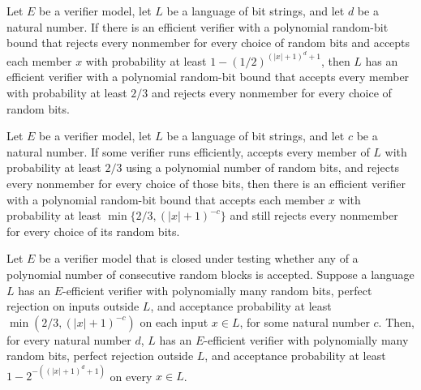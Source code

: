 \begin{theorem}
\label{Randomized.InRPStrong.toInRP}
\leanok
{}
Let $E$ be a verifier model, let $L$ be a language of bit strings, and let $d$ be a
natural number. If there is an efficient verifier with a polynomial random-bit bound
that rejects every nonmember for every choice of random bits and accepts each member $x$
with probability at least $1-(1/2)^{(|x|+1)^d+1}$, then $L$ has an efficient verifier
with a polynomial random-bit bound that accepts every member with probability at least
$2/3$ and rejects every nonmember for every choice of random bits.
\end{theorem}

\begin{theorem}
\label{Randomized.InRP.toInRPWeak}
\leanok
{}
Let $E$ be a verifier model, let $L$ be a language of bit strings, and let $c$ be a
natural number. If some verifier runs efficiently, accepts every member of $L$ with
probability at least $2/3$ using a polynomial number of random bits, and rejects every
nonmember for every choice of those bits, then there is an efficient verifier with a
polynomial random-bit bound that accepts each member $x$ with probability at least
$\min\{2/3,(|x|+1)^{-c}\}$ and still rejects every nonmember for every choice of its
random bits.
\end{theorem}

\begin{theorem}
\label{Randomized.rp_error_reduction}
\leanok
{}
Let $E$ be a verifier model that is closed under testing whether any of a polynomial
number of consecutive random blocks is accepted. Suppose a language $L$ has an
$E$-efficient verifier with polynomially many random bits, perfect rejection on inputs
outside $L$, and acceptance probability at least $\min(2/3,(|x|+1)^{-c})$ on each input
$x\in L$, for some natural number $c$. Then, for every natural number $d$, $L$ has an
$E$-efficient verifier with polynomially many random bits, perfect rejection outside
$L$, and acceptance probability at least $1-2^{-((|x|+1)^d+1)}$ on every $x\in L$.
\end{theorem}

